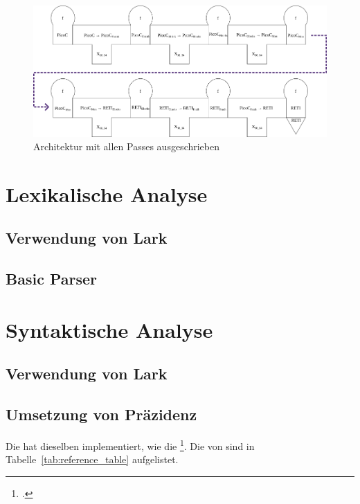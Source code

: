 \begin{figure}
  \centering
  \includegraphics[width=\linewidth]{./figures/passes.png}
  \caption{Architektur mit allen Passes ausgeschrieben}
\end{figure}

\section{Lexikalische Analyse}
\subsection{Verwendung von Lark}
\subsection{Basic Parser}
\section{Syntaktische Analyse}
\subsection{Verwendung von Lark}
\subsection{Umsetzung von Präzidenz}
Die  hat dieselben  implementiert, wie die  \footcite{noauthor_c_nodate}. Die  von  sind in Tabelle~\ref{tab:reference_table} aufgelistet.

